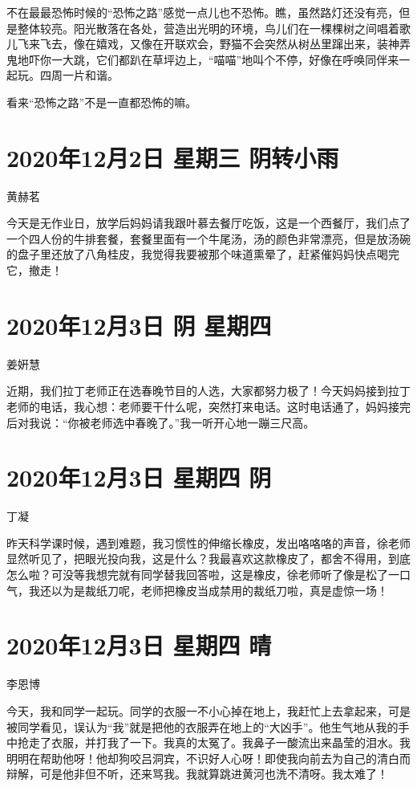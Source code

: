 不在最最恐怖时候的“恐怖之路”感觉一点儿也不恐怖。瞧，虽然路灯还没有亮，但是整体较亮。阳光散落在各处，营造出光明的环境，鸟儿们在一棵棵树之间唱着歌儿飞来飞去，像在嬉戏，又像在开联欢会，野猫不会突然从树丛里蹿出来，装神弄鬼地吓你一大跳，它们都趴在草坪边上，“喵喵”地叫个不停，好像在呼唤同伴来一起玩。四周一片和谐。

看来“恐怖之路”不是一直都恐怖的嘛。

\section{2020年12月2日 星期三 阴转小雨}

黄赫茗

今天是无作业日，放学后妈妈请我跟叶慕去餐厅吃饭，这是一个西餐厅，我们点了一个四人份的牛排套餐，套餐里面有一个牛尾汤，汤的颜色非常漂亮，但是放汤碗的盘子里还放了八角桂皮，我觉得我要被那个味道熏晕了，赶紧催妈妈快点喝完它，撤走！

\section{2020年12月3日 阴 星期四}

姜姸慧

近期，我们拉丁老师正在选春晚节目的人选，大家都努力极了！今天妈妈接到拉丁老师的电话，我心想：老师要干什么呢，突然打来电话。这时电话通了，妈妈接完后对我说：“你被老师选中春晚了。”我一听开心地一蹦三尺高。

\section{2020年12月3日 星期四 阴}

丁凝

昨天科学课时候，遇到难题，我习惯性的伸缩长橡皮，发出咯咯咯的声音，徐老师显然听见了，把眼光投向我，这是什么？我最喜欢这款橡皮了，都舍不得用，到底怎么啦？可没等我想完就有同学替我回答啦，这是橡皮，徐老师听了像是松了一口气，我还以为是裁纸刀呢，老师把橡皮当成禁用的裁纸刀啦，真是虚惊一场！

\section{2020年12月3日 星期四 晴}

李恩博

今天，我和同学一起玩。同学的衣服一不小心掉在地上，我赶忙上去拿起来，可是被同学看见，误认为“我”就是把他的衣服弄在地上的“大凶手”。他生气地从我的手中抢走了衣服，并打我了一下。我真的太冤了。我鼻子一酸流出来晶莹的泪水。我明明在帮助他呀！他却狗咬吕洞宾，不识好人心呀！即使我向前去为自己的清白而辩解，可是他非但不听，还来骂我。我就算跳进黄河也洗不清呀。我太难了！

